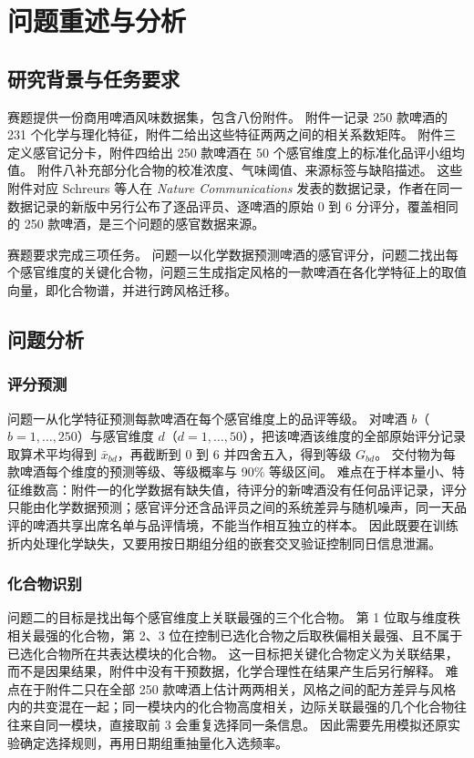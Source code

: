 \section{问题重述与分析}

\subsection{研究背景与任务要求}

赛题提供一份商用啤酒风味数据集，包含八份附件。
附件一记录 250 款啤酒的 231 个化学与理化特征，附件二给出这些特征两两之间的相关系数矩阵。
附件三定义感官记分卡，附件四给出 250 款啤酒在 50 个感官维度上的标准化品评小组均值。
附件八补充部分化合物的校准浓度、气味阈值、来源标签与缺陷描述。
这些附件对应 Schreurs 等人在 \emph{Nature Communications} 发表的数据记录，作者在同一数据记录的新版中另行公布了逐品评员、逐啤酒的原始 0 到 6 分评分，覆盖相同的 250 款啤酒，是三个问题的感官数据来源。

赛题要求完成三项任务。
问题一以化学数据预测啤酒的感官评分，问题二找出每个感官维度的关键化合物，问题三生成指定风格的一款啤酒在各化学特征上的取值向量，即化合物谱，并进行跨风格迁移。

\subsection{问题分析}

\subsubsection{评分预测}

问题一从化学特征预测每款啤酒在每个感官维度上的品评等级。
对啤酒 $b$（$b=1,\dots,250$）与感官维度 $d$（$d=1,\dots,50$），把该啤酒该维度的全部原始评分记录取算术平均得到 $\bar x_{bd}$，再截断到 0 到 6 并四舍五入，得到等级 $G_{bd}$。
交付物为每款啤酒每个维度的预测等级、等级概率与 90\% 等级区间。
难点在于样本量小、特征维数高：附件一的化学数据有缺失值，待评分的新啤酒没有任何品评记录，评分只能由化学数据预测；感官评分还含品评员之间的系统差异与随机噪声，同一天品评的啤酒共享出席名单与品评情境，不能当作相互独立的样本。
因此既要在训练折内处理化学缺失，又要用按日期组分组的嵌套交叉验证控制同日信息泄漏。

\subsubsection{化合物识别}

问题二的目标是找出每个感官维度上关联最强的三个化合物。
第 1 位取与维度秩相关最强的化合物，第 2、3 位在控制已选化合物之后取秩偏相关最强、且不属于已选化合物所在共表达模块的化合物。
这一目标把关键化合物定义为关联结果，而不是因果结果，附件中没有干预数据，化学合理性在结果产生后另行解释。
难点在于附件二只在全部 250 款啤酒上估计两两相关，风格之间的配方差异与风格内的共变混在一起；同一模块内的化合物高度相关，边际关联最强的几个化合物往往来自同一模块，直接取前 3 会重复选择同一条信息。
因此需要先用模拟还原实验确定选择规则，再用日期组重抽量化入选频率。

